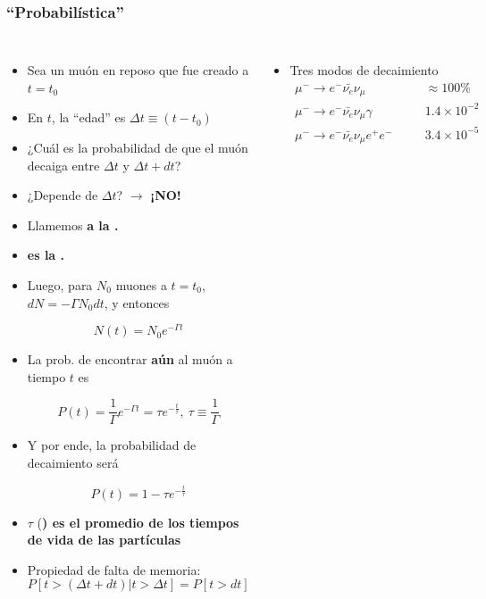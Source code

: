 \documentclass[xetex,mathserif,serif,10pt]{beamer}
\newcommand{\sblock}[2]{\bf{\color{chart#1}{#2}}}
\newcommand{\be}[2]{
  \vspace{-0.5em}
  \begin{equation}\label{#2}
    #1
  \end{equation}
  \vspace{-1em}
}
\begin{document}
\begin{frame}
  \frametitle{``Probabilística''}
  \tiny{
    \begin{columns}
      \begin{itemize}
        \item Sea un muón en reposo que fue creado a $t=t_0$
        \item En $t$, la ``edad'' es $\Delta t \equiv (t-t_0)$
        \item ¿Cuál es la probabilidad de que el muón decaiga entre $\Delta t$ y $\Delta t + dt$?
        \item \alert{¿Depende de $\Delta t$?} $\to$ {\bf{\alert{¡NO!}}}
        \item Llamemos \sblock{12}{$\Gamma$} a la \sblock{12}{probabilidad de decaimiento por unidad de tiempo}. 
        \item \sblock{12}{$\Gamma$} es la \sblock{12}{tasa de decaimiento}. 
        \item Luego, para $N_0$ muones a $t=t_0$, $dN=-\Gamma N_0 dt$, y entonces
          \be{N(t)=N_0 e^{-\Gamma t}}{EQLexp}
        \item La prob. de encontrar {\bf aún} al muón a tiempo $t$ es 
          \be{P(t) = \frac1\Gamma e^{-\Gamma t} = \tau e^{-{\frac t\tau}},\ \tau\equiv\frac1\Gamma}{EQPexp}
        \item Y por ende, la probabilidad de decaimiento será 
          \be{P(t) = 1 - \tau e^{-{\frac t\tau}}}{EQPdec}
        \item $\tau$ (\sblock{12}{vida media}) es el promedio de los tiempos de vida de las partículas
        \item Propiedad de falta de memoria: 
          \vspace{-0.5em}
          \[{ P[t>(\Delta t + dt) | t>\Delta t] = P[t>dt] }\]
          \vspace{-1.0em}
      \end{itemize}
      \begin{itemize}
        \item Tres modos de decaimiento
        \begin{eqnarray*}
          \mu^- \to e^- \bar{\nu_e} \nu_\mu         &\quad& \approx 100\%\\
          \mu^- \to e^- \bar{\nu_e} \nu_\mu \gamma  &\quad& 1.4\times10^{-2}\\
          \mu^- \to e^- \bar{\nu_e} \nu_\mu e^+ e^- &\quad& 3.4\times10^{-5}
        \end{eqnarray*}

\end{itemize}
\end{columns}}
\end{frame}
\end{document}
